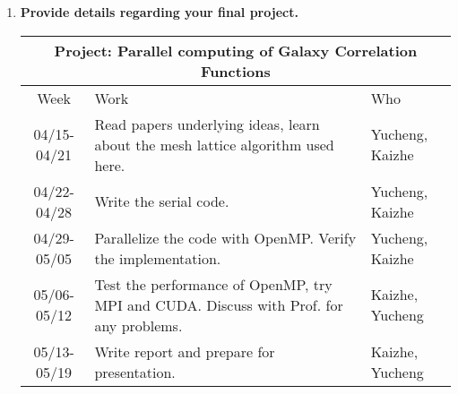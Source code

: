 \documentclass[12pt]{article}
\begin{document}
\begin{enumerate}
\item {\bf Provide details regarding your final project.}
  
  \begin{center}
  \begin{tabular} {|c|p{9cm}|p{2cm}|}
    \hline
    \multicolumn{3}{|c|}{\bf Project: Parallel computing of Galaxy Correlation Functions} \\
    \hline
    Week & Work & Who  \\ \hline \hline
    04/15-04/21 & Read papers underlying ideas, learn about the mesh lattice algorithm used here. & Yucheng, Kaizhe \\ \hline
    04/22-04/28 & Write the serial code. & Yucheng, Kaizhe \\ \hline
    04/29-05/05 & Parallelize the code with OpenMP. Verify the implementation. & Yucheng, Kaizhe \\ \hline
    05/06-05/12 & Test the performance of OpenMP, try MPI and CUDA. Discuss with Prof. for any problems. & Kaizhe, Yucheng \\ \hline
    05/13-05/19 & Write report and prepare for presentation.  & Kaizhe, Yucheng \\ \hline
  \end{tabular}
  \end{center}



\end{enumerate}
\end{document}
